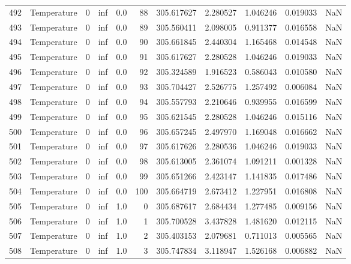 \begin{tabular}{llrrrrrrrrr}
492 &  Temperature &       0 &  inf &  0.0 &   88 &  305.617627 &  2.280527 &  1.046246 &   0.019033 &      NaN \\
493 &  Temperature &       0 &  inf &  0.0 &   89 &  305.560411 &  2.098005 &  0.911377 &   0.016558 &      NaN \\
494 &  Temperature &       0 &  inf &  0.0 &   90 &  305.661845 &  2.440304 &  1.165468 &   0.014548 &      NaN \\
495 &  Temperature &       0 &  inf &  0.0 &   91 &  305.617627 &  2.280528 &  1.046246 &   0.019033 &      NaN \\
496 &  Temperature &       0 &  inf &  0.0 &   92 &  305.324589 &  1.916523 &  0.586043 &   0.010580 &      NaN \\
497 &  Temperature &       0 &  inf &  0.0 &   93 &  305.704427 &  2.526775 &  1.257492 &   0.006084 &      NaN \\
498 &  Temperature &       0 &  inf &  0.0 &   94 &  305.557793 &  2.210646 &  0.939955 &   0.016599 &      NaN \\
499 &  Temperature &       0 &  inf &  0.0 &   95 &  305.621545 &  2.280528 &  1.046246 &   0.015116 &      NaN \\
500 &  Temperature &       0 &  inf &  0.0 &   96 &  305.657245 &  2.497970 &  1.169048 &   0.016662 &      NaN \\
501 &  Temperature &       0 &  inf &  0.0 &   97 &  305.617626 &  2.280536 &  1.046246 &   0.019033 &      NaN \\
502 &  Temperature &       0 &  inf &  0.0 &   98 &  305.613005 &  2.361074 &  1.091211 &   0.001328 &      NaN \\
503 &  Temperature &       0 &  inf &  0.0 &   99 &  305.651266 &  2.423147 &  1.141835 &   0.017486 &      NaN \\
504 &  Temperature &       0 &  inf &  0.0 &  100 &  305.664719 &  2.673412 &  1.227951 &   0.016808 &      NaN \\
505 &  Temperature &       0 &  inf &  1.0 &    0 &  305.687617 &  2.684434 &  1.277485 &   0.009156 &      NaN \\
506 &  Temperature &       0 &  inf &  1.0 &    1 &  305.700528 &  3.437828 &  1.481620 &   0.012115 &      NaN \\
507 &  Temperature &       0 &  inf &  1.0 &    2 &  305.403153 &  2.079681 &  0.711013 &   0.005565 &      NaN \\
508 &  Temperature &       0 &  inf &  1.0 &    3 &  305.747834 &  3.118947 &  1.526168 &   0.006882 &      NaN \\

\end{tabular}
